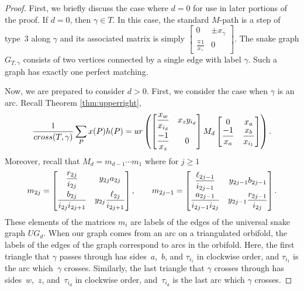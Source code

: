 \documentclass[11pt]{article}
\numberwithin{equation}{section}
\begin{document}
\begin{proof}First, we briefly discuss the case where $d=0$ for use in later portions of the proof. If $d = 0$, then $\gamma \in T$. In this case, the standard $M$-path is a step of type~3 along $\gamma$ and its associated matrix is simply $\left[\begin{smallmatrix} 0 & \pm x_\gamma \\ \frac{\mp 1}{x_\gamma} & 0 \end{smallmatrix}\right]$. The snake graph $G_{T,\gamma}$ consists of two vertices connected by a single edge with label $\gamma$. Such a graph has exactly one perfect matching.

Now, we are prepared to consider $d > 0$. First, we consider the case when $\gamma$ is an arc. Recall Theorem \ref{thm:upperright}, \[\frac{1}{{\rm cross}(T,\gamma)} \sum_P x(P) h(P)
=
{\rm ur} \left( \begin{bmatrix} \dfrac{x_w}{x_{i_d}} & x_z y_{i_d} \vspace{1mm}\\ \dfrac{-1}{x_z} & 0 \end{bmatrix} M_d \begin{bmatrix} 0 & x_a \\ \dfrac{-1}{x_a} & \dfrac{x_b}{x_{i_1}} \end{bmatrix}\right).\] Moreover, recall that $M_d = m_{d-1} \cdots m_1$ where for $j \geq 1$\[
m_{2j} = \begin{bmatrix}\dfrac{r_{2j}}{i_{2j}} & y_{2j} a_{2j} \vspace{1mm}\\ \dfrac{b_{2j}}{i_{2j}i_{2j+1}} & y_{2j} \dfrac{\ell_{2j}}{i_{2j+1}} \end{bmatrix}, \qquad m_{2j-1} = \begin{bmatrix} \dfrac{\ell_{2j-1}}{i_{2j-1}} & y_{2j-1} b_{2j-1} \vspace{1mm}\\ \dfrac{a_{2j-1}}{i_{2j-1}i_{2j}} & y_{2j-1} \dfrac{r_{2j-1}}{i_{2j}} \end{bmatrix}.
\] These elements of the matrices $m_i$ are labels of the edges of the universal snake graph $UG_d$. When our graph comes from an arc on a triangulated orbifold, the labels of the edges of the graph correspond to arcs in the orbifold. Here, the first triangle that $\gamma$ passes through has sides~$a$,~$b$, and $\tau_{i_1}$ in clockwise order, and $\tau_{i_1}$ is the arc which~$\gamma$ crosses. Similarly, the last triangle that $\gamma$ crosses through has sides~$w$,~$z$, and~$\tau_{i_d}$ in clockwise order, and~$\tau_{i_d}$ is the last arc which $\gamma$ crosses.


\end{proof}
\end{document}
